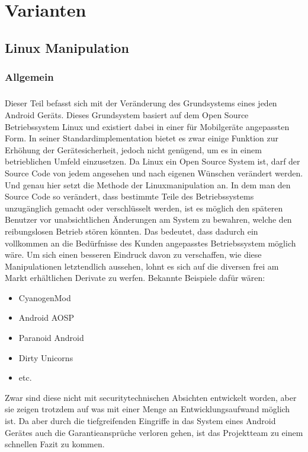 \chapter{Varianten}
\section{Linux Manipulation}
\subsection{Allgemein}
\paragraph*{}
Dieser Teil befasst sich mit der Veränderung des Grundsystems eines jeden Android Geräts. Dieses Grundsystem basiert auf dem Open Source Betriebssystem Linux und existiert dabei in einer für Mobilgeräte angepassten Form. In seiner Standardimplementation bietet es zwar einige Funktion zur Erhöhung der Gerätesicherheit, jedoch nicht genügend, um es in einem betrieblichen Umfeld einzusetzen. Da Linux ein Open Source System ist, darf der Source Code von jedem angesehen und nach eigenen Wünschen verändert werden. Und genau hier setzt die Methode der Linuxmanipulation an. In dem man den Source Code so verändert, dass bestimmte Teile des Betriebssystems unzugänglich gemacht oder verschlüsselt werden, ist es möglich den späteren Benutzer vor unabsichtlichen Änderungen am System zu bewahren, welche den reibungslosen Betrieb stören könnten. Das bedeutet, dass dadurch ein vollkommen an die Bedürfnisse des Kunden angepasstes Betriebssystem möglich wäre. Um sich einen besseren Eindruck davon zu verschaffen, wie diese Manipulationen letztendlich aussehen, lohnt es sich auf die diversen frei am Markt erhältlichen Derivate zu werfen. Bekannte Beispiele dafür wären:
\begin{itemize}
	\item CyanogenMod
	\item Android AOSP
	\item Paranoid Android
	\item Dirty Unicorns
	\item etc.
\end{itemize}
Zwar sind diese nicht mit securitytechnischen Absichten entwickelt worden, aber sie zeigen trotzdem auf was mit einer Menge an Entwicklungsaufwand möglich ist. Da aber durch die tiefgreifenden Eingriffe in das System eines Android Gerätes auch die Garantieansprüche verloren gehen, ist das Projektteam zu einem schnellen Fazit zu kommen.
